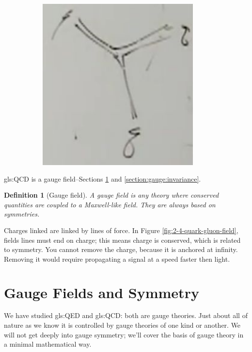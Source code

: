 \documentclass[]{article}
\newtheorem{defn}[thm]{Definition}
\begin{document}
\begin{figure}[H]
\begin{subfigure}[t]{0.45\textwidth}
		\includegraphics[width=0.9\textwidth]{particles-2-4-three-quarks}
	\end{subfigure}
\end{figure}

\gls{gls:QCD} is a gauge field--Sections \ref{section:gauge:symmetry} and \ref{section:gauge:invariance}.

\begin{defn}[Gauge field]\label{defn:gauge:field}
	A gauge field is any theory where conserved quantities are coupled to a Maxwell-like field. They are always based on symmetries.
\end{defn}

Charges linked are linked by lines of force. In Figure \ref{fig:2-4-quark-gluon-field}, fields lines must end on charge; this means charge is conserved, which is related to symmetry. You cannot remove the charge, because it is anchored at infinity. Removing it would require propagating a signal at a speed faster then light.

\section{Gauge Fields and Symmetry}\label{section:gauge:symmetry}
 
We have studied \gls{gls:QED} and \gls{gls:QCD}: both are gauge theories. Just about all of nature as we know it is controlled by gauge theories of one kind or another. We will not get deeply into gauge symmetry; we'll cover the basis of gauge theory in a minimal mathematical way.
\end{document}
